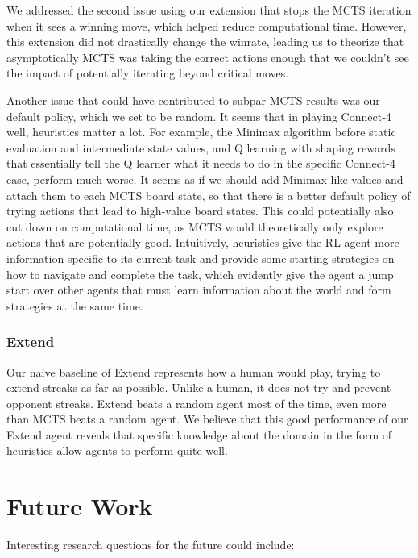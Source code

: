\documentclass[12pt]{article}
\begin{document}
We addressed the second issue using our extension that stops the MCTS iteration when it sees a winning move, which helped reduce computational time. However, this extension did not drastically change the winrate, leading us to theorize that asymptotically MCTS was taking the correct actions enough that we couldn't see the impact of potentially iterating beyond critical moves.

Another issue that could have contributed to subpar MCTS results was our default policy, which we set to be random. It seems that in playing Connect-4 well, heuristics matter a lot. For example, the Minimax algorithm before static evaluation and intermediate state values, and Q learning with shaping rewards that essentially tell the Q learner what it needs to do in the specific Connect-4 case, perform much worse. It seems as if we should add Minimax-like values and attach them to each MCTS board state, so that there is a better default policy of trying actions that lead to high-value board states. This could potentially also cut down on computational time, as MCTS would theoretically only explore actions that are potentially good. Intuitively, heuristics give the RL agent more information specific to its current task and provide some starting strategies on how to navigate and complete the task, which evidently give the agent a jump start over other agents that must learn information about the world and form strategies at the same time. 

\subsubsection{Extend}

Our naive baseline of Extend represents how a human would play, trying to extend streaks as far as possible. Unlike a human, it does not try and prevent opponent streaks. Extend beats a random agent most of the time, even more than MCTS beats a random agent. We believe that this good performance of our Extend agent reveals that specific knowledge about the domain in the form of heuristics allow agents to perform quite well. 


\section{Future Work}

Interesting research questions for the future could include:
\end{document}
